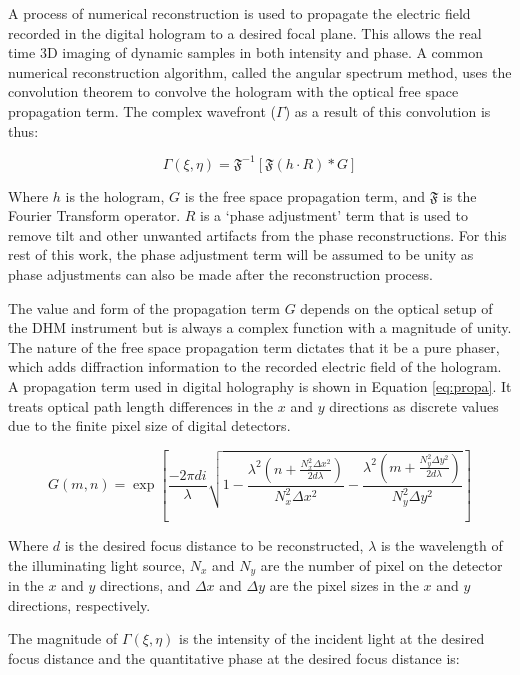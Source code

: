 \documentclass[10pt,letterpaper]{article}
\begin{document}
A process of numerical reconstruction is used to propagate the electric field recorded in the digital hologram to a desired focal plane. This allows the real time 3D imaging of dynamic samples in both intensity and phase. A common numerical reconstruction algorithm, called the angular spectrum method, uses the convolution theorem to convolve the hologram with the optical free space propagation term. The complex wavefront ($\Gamma$) as a result of this convolution is thus:

 \begin{equation}
 \Gamma(\xi,\eta)=\mathfrak{F}^{-1}[\mathfrak{F}(h\cdot R)*G]
 \label{eq:recon}
 \end{equation}
 
 Where $h$ is the hologram, $G$ is the free space propagation term, and $\mathfrak{F}$ is the Fourier Transform operator. $R$ is a `phase adjustment' term that is used to remove tilt and other unwanted artifacts from the phase reconstructions. For this rest of this work, the phase adjustment term will be assumed to be unity as phase adjustments can also be made after the reconstruction process.\par
 
   The value and form of the propagation term $G$ depends on the optical setup of the DHM instrument but is always a complex function with a magnitude of unity. The nature of the free space propagation term dictates that it be a pure phaser, which adds diffraction information to the recorded electric field of the hologram. A propagation term used in digital holography is shown in Equation \ref{eq:propa}. It treats optical path length differences in the $x$ and $y$ directions as discrete values due to the finite pixel size of digital detectors.
 
 \begin{equation}
 G(m,n)=\exp\left[\frac{-2\pi di}{\lambda}\sqrt{1-\frac{\lambda^2\left(n+\frac{N_x^2\Delta x^2}{2d\lambda}\right)}{N_x^2\Delta x^2} - \frac{\lambda^2\left(m+\frac{N_y^2\Delta y^2}{2d\lambda}\right)}{N_y^2\Delta y^2}  }\right]
 \label{eq:propa}
 \end{equation}
 
 Where $d$ is the desired focus distance to be reconstructed, $\lambda$ is the wavelength of the illuminating light source, $N_x$ and $N_y$ are the number of pixel on the detector in the $x$ and $y$ directions, and $\Delta x$ and $\Delta y$ are the pixel sizes in the $x$ and $y$ directions, respectively.
 
 The magnitude of $\Gamma(\xi,\eta)$ is the intensity of the incident light at the desired focus distance and the quantitative phase at the desired focus distance is:
 
\end{document}
